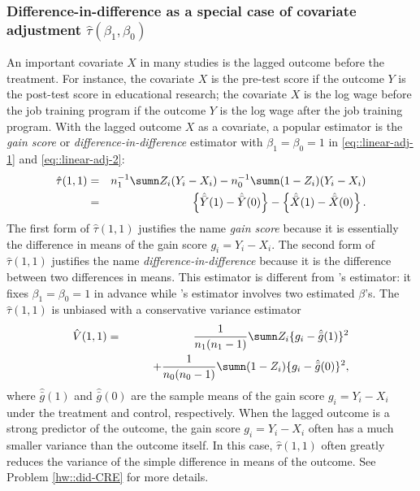 \subsubsection{Difference-in-difference as a special case of covariate adjustment $\hat \tau(\beta_1, \beta_0)$}\label{sec::difference-in-difference-CRE}
An important covariate $X$ in many studies is the lagged outcome before the treatment. For instance, the covariate $X$ is the pre-test score if the outcome $Y$ is the post-test score in educational research; the covariate $X$ is the log wage before the job training program if the outcome $Y$ is the log wage after the job training program. With the lagged outcome $X$ as a covariate, a popular estimator is the {\it gain score} or {\it difference-in-difference} estimator with $\beta_1 = \beta_0=1$ in \eqref{eq::linear-adj-1} and \eqref{eq::linear-adj-2}: 
\begin{eqnarray*}
\hat{\tau}(1,1) &=& n_1^{-1} \sumn Z_i(Y_i -   X_i) - n_0^{-1} \sumn (1-Z_i) (Y_i -   X_i) \\
&=& \left\{   \hat{\bar{Y}}(1) - \hat{\bar{Y}}(0) \right\} -  \left\{   \hat{\bar{X} }(1) - \hat{\bar{X} }(0) \right\} .
\end{eqnarray*}
The first form of $\hat{\tau}(1,1) $ justifies the name {\it gain score} because it is essentially the difference in means of the gain score $g_i = Y_i - X_i$. 
The second form of $\hat{\tau}(1,1) $ justifies the name {\it difference-in-difference} because it is the difference between two differences in means. 
This estimator is different from \citet{lin2013}'s estimator: it fixes $\beta_1 = \beta_0=1$ in advance while \citet{lin2013}'s estimator involves two estimated $\beta$'s. The $\hat{\tau}(1,1) $ is unbiased
with a conservative variance estimator
\begin{eqnarray*}
\hat{V}( 1,1 ) 
&=& \frac{1}{n_1(n_1 - 1)} \sumn Z_i  \{ g_i - \hat{\bar{g}}(1)   \}^2 \\
& & \qquad + \frac{1}{n_0(n_0 - 1)} \sumn (1-Z_i)  \{ g_i - \hat{\bar{g}}(0)   \}^2,
\end{eqnarray*}
where $\hat{\bar{g}}(1)$ and $ \hat{\bar{g}}(0)$ are the sample means of the gain score $g_i = Y_i - X_i$ under the treatment and control, respectively. 
When the lagged outcome is a strong predictor of the outcome, the gain score $g_i = Y_i - X_i$ often has a much smaller variance than the outcome itself. In this case, $\hat{\tau}(1,1) $ often greatly reduces the variance of the simple difference in means of the outcome. 
See Problem \ref{hw::did-CRE} for more details. 


